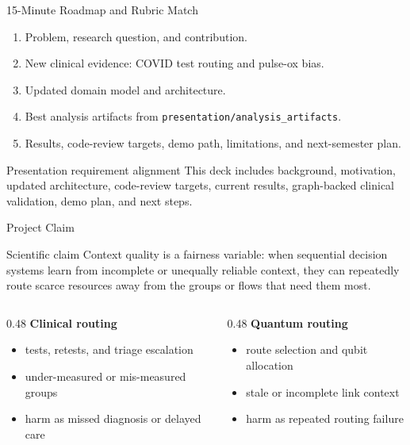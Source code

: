 \begin{frame}
  \titlepage
\end{frame}

\begin{frame}{15-Minute Roadmap and Rubric Match}
\begin{enumerate}
    \item Problem, research question, and contribution.
    \item New clinical evidence: COVID test routing and pulse-ox bias.
    \item Updated domain model and architecture.
    \item Best analysis artifacts from \texttt{presentation/analysis\_artifacts}.
    \item Results, code-review targets, demo path, limitations, and next-semester plan.
\end{enumerate}
\begin{block}{Presentation requirement alignment}
This deck includes background, motivation, updated architecture, code-review targets, current results, graph-backed clinical validation, demo plan, and next steps.
\end{block}
\end{frame}

\begin{frame}{Project Claim}
\begin{block}{Scientific claim}
Context quality is a fairness variable: when sequential decision systems learn from incomplete or unequally reliable context, they can repeatedly route scarce resources away from the groups or flows that need them most.
\end{block}
\begin{columns}[T]
\begin{column}{0.48\textwidth}
\textbf{Clinical routing}
\begin{itemize}
    \item tests, retests, and triage escalation
    \item under-measured or mis-measured groups
    \item harm as missed diagnosis or delayed care
\end{itemize}
\end{column}
\begin{column}{0.48\textwidth}
\textbf{Quantum routing}
\begin{itemize}
    \item route selection and qubit allocation
    \item stale or incomplete link context
    \item harm as repeated routing failure
\end{itemize}
\end{column}
\end{columns}
\end{frame}

